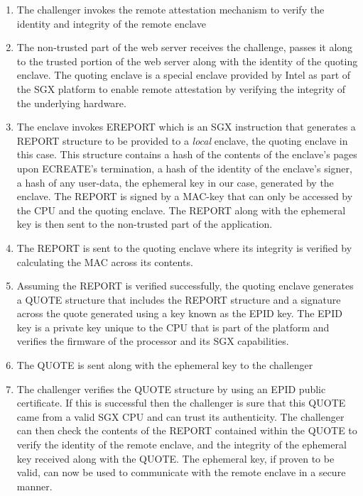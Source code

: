 \documentclass[../main.tex]{subfiles}
\begin{document}
\begin{enumerate}
	\item The challenger invokes the remote attestation mechanism to verify the identity and integrity of the remote enclave
	\item The non-trusted part of the web server receives the challenge, passes it along to the trusted portion of the web server
	      along with the identity of the quoting enclave. The quoting enclave is a special enclave provided by Intel as part of the SGX
	      platform to enable remote attestation by verifying the integrity of the underlying hardware. %
	\item The enclave invokes EREPORT which is an SGX instruction that generates a REPORT structure to be provided to a \textit{local} enclave, the quoting enclave in this case.
	      This structure contains a hash of the contents of the enclave's pages upon ECREATE's termination, a hash of the identity of the enclave's signer, a hash of any user-data, the ephemeral key in our case,
	      generated by the enclave. The REPORT is signed by a MAC-key that can only be accessed by the CPU and the quoting enclave. The REPORT along with the ephemeral key is then sent to the non-trusted part of the application.
	\item The REPORT is sent to the quoting enclave where its integrity is verified by calculating the MAC across its contents. 
	\item Assuming the REPORT is verified successfully, the quoting enclave generates a QUOTE structure that includes the REPORT structure and a signature across
	      the quote generated using a key known as the EPID key. %
	      The EPID key is a private key unique to the CPU that is part of the platform and verifies the firmware of the processor and its SGX capabilities. 
	\item The QUOTE is sent along with the ephemeral key to the challenger
	\item The challenger verifies the QUOTE structure by using an EPID public certificate. If this is successful then the challenger is sure that this QUOTE came from a valid SGX CPU and can trust
	      its authenticity. The challenger can then check the contents of the REPORT contained within the QUOTE to verify the identity of the remote enclave, and the integrity of the ephemeral key 
	      received along with the QUOTE. The ephemeral key, if proven to be valid, can now be used to communicate with the remote enclave in a secure manner.  
\end{enumerate}
		
\end{document}
